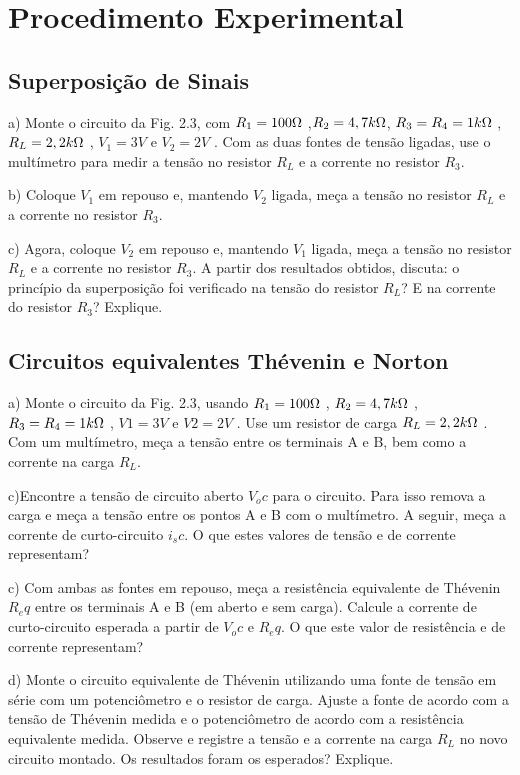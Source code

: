 \newpage

\section{Procedimento Experimental}

\subsection{Superposição de Sinais}

\noindent a) Monte o circuito da Fig. 2.3, com $R_1 = 100 \ohm$ ,$ R_2 = 4, 7 k\ohm$, $R_3 = R_4 = 1 k\ohm$ , $R_L = 2, 2 k\ohm$ , $V_1 = 3 V$ e $V_2 = 2 V$ . Com as duas fontes de tensão ligadas, use o multímetro para medir a tensão no resistor $R_L$ e a corrente no resistor $R_3$. 

\noindent b) Coloque $V_1$ em repouso e, mantendo $V_2$ ligada, meça a tensão no resistor $R_L$ e a corrente no resistor $R_3$. 

\noindent c) Agora, coloque $V_2$ em repouso e, mantendo $V_1$ ligada, meça a tensão no resistor $R_L$ e a corrente no resistor $R_3$. A partir dos resultados obtidos, discuta: o princípio da superposição foi verificado na tensão do resistor $R_L$? E na corrente do resistor $R_3$? Explique.


\subsection{Circuitos equivalentes Thévenin e Norton}


\noindent a) Monte o circuito da Fig. 2.3, usando $R_1 = 100 \ohm$ , $R_2 = 4, 7 k\ohm$ , $R_3 = R_4 = 1 k\ohm$ , $V 1 = 3 V$ e $V 2 = 2 V$ . Use um resistor de carga $R_L = 2, 2 k\ohm$ . Com um multímetro, meça a tensão entre os terminais A e B, bem como a corrente na carga $R_L $.      

\noindent c)Encontre a tensão de circuito aberto $V_oc$ para o circuito. Para isso remova a carga e meça a tensão entre os pontos A e B com o multímetro. A seguir, meça a corrente de curto-circuito $i_sc$. O que estes valores de tensão e de corrente representam? 

\noindent c) Com ambas as fontes em repouso, meça a resistência equivalente de Thévenin $R_eq$ entre os terminais A e B (em aberto e sem carga). Calcule a corrente de curto-circuito esperada a partir de $V_oc$ e $R_eq$. O que este valor de resistência e de corrente representam? 

\noindent d) Monte o circuito equivalente de Thévenin utilizando uma fonte de tensão em série com um potenciômetro e o resistor de carga. Ajuste a fonte de acordo com a tensão de Thévenin medida e o potenciômetro de acordo com a resistência equivalente medida. Observe e registre a tensão e a corrente na carga $R_L$ no novo circuito montado. Os resultados foram os esperados? Explique.
